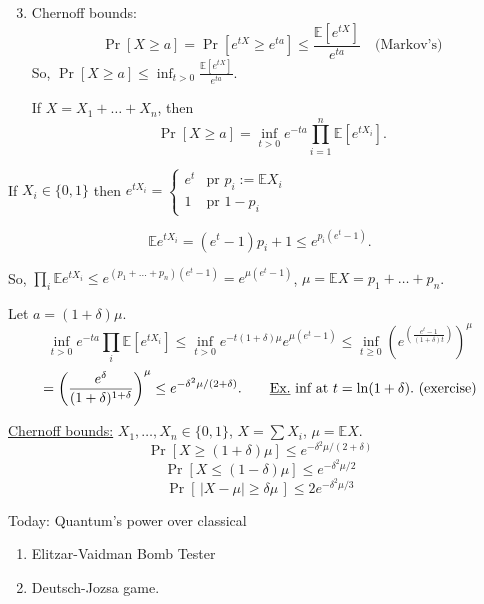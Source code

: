 \documentclass[11pt]{article}
\begin{document}
\begin{enumerate}
\setcounter{enumi}{2}
\item[\textcircled{3}] Chernoff bounds:
\[
\Pr[X\geq a] = \Pr[e^{tX}\geq e^{ta}] \leq \frac{\mathbb{E}[e^{tX}]}{e^{ta}} \quad \text{(Markov's)}
\]
So, $\displaystyle \Pr[X\geq a] \leq \inf_{t>0} \frac{\mathbb{E}[e^{tX}]}{e^{ta}}$.

If $X = X_1+\dots+X_n$, then
\[
\Pr[X\geq a] = \inf_{t>0} e^{-ta}\prod_{i=1}^n \mathbb{E}[e^{tX_i}].
\]
\end{enumerate}

If $X_i \in \{0,1\}$ then $e^{tX_i} = \begin{cases} e^t & \text{pr } p_i := \mathbb{E}X_i \\ 1 & \text{pr } 1-p_i \end{cases}$

\[
\mathbb{E}e^{tX_i} = (e^t-1)p_i + 1 \leq e^{p_i(e^t-1)}.
\]

So, $\displaystyle\prod_i \mathbb{E}e^{tX_i} \leq e^{(p_1+\dots+p_n)(e^t-1)} = e^{\mu(e^t-1)}$, \quad $\mu = \mathbb{E}X = p_1+\dots+p_n$.

Let $a = (1+\delta)\mu$.
\[
\inf_{t>0} e^{-ta}\prod_i \mathbb{E}[e^{tX_i}] \leq \inf_{t>0} e^{-t(1+\delta)\mu} e^{\mu(e^t-1)} \leq \inf_{t\geq0}\left(e^{\left(\frac{e^t-1}{(1+\delta)t}\right)}\right)^\mu
\]
\[
= \left(\frac{e^\delta}{(1+\delta)^{1+\delta}}\right)^\mu \leq e^{-\delta^2\mu/(2+\delta)}. \qquad \text{\underline{Ex.} inf at } t=\ln(1+\delta). \text{ (exercise)}
\]

\underline{Chernoff bounds:} $X_1,\dots,X_n\in\{0,1\}$, $X=\sum X_i$, $\mu=\mathbb{E}X$.
\[
\Pr[X\geq(1+\delta)\mu] \leq e^{-\delta^2\mu/(2+\delta)}
\]
\[
\Pr[X\leq(1-\delta)\mu] \leq e^{-\delta^2\mu/2}
\]
\[
\Pr[\,|X-\mu|\geq\delta\mu\,] \leq 2e^{-\delta^2\mu/3}
\]

Today: Quantum's power over classical
\begin{enumerate}
    \item[\textcircled{1}] Elitzar-Vaidman Bomb Tester
    \item[\textcircled{2}] Deutsch-Jozsa game.
\end{enumerate}
\end{document}

